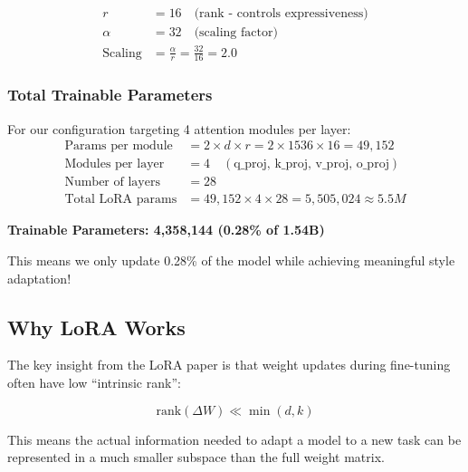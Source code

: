 \documentclass[12pt,a4paper]{article}
\begin{document}
\begin{align}
    r &= 16 \quad \text{(rank - controls expressiveness)} \\
    \alpha &= 32 \quad \text{(scaling factor)} \\
    \text{Scaling} &= \frac{\alpha}{r} = \frac{32}{16} = 2.0
\end{align}

\subsubsection{Total Trainable Parameters}

For our configuration targeting 4 attention modules per layer:
\begin{align}
    \text{Params per module} &= 2 \times d \times r = 2 \times 1536 \times 16 = 49,152 \\
    \text{Modules per layer} &= 4 \quad (\text{q\_proj, k\_proj, v\_proj, o\_proj}) \\
    \text{Number of layers} &= 28 \\
    \text{Total LoRA params} &= 49,152 \times 4 \times 28 = 5,505,024 \approx 5.5M
\end{align}

\begin{tcolorbox}[colback=green!5!white,colframe=green!75!black,title=Parameter Efficiency]
\begin{center}
\textbf{Trainable Parameters: 4,358,144 (0.28\% of 1.54B)}
\end{center}
This means we only update 0.28\% of the model while achieving meaningful style adaptation!
\end{tcolorbox}

\subsection{Why LoRA Works}

The key insight from the LoRA paper is that weight updates during fine-tuning often have low ``intrinsic rank'':

\begin{equation}
    \text{rank}(\Delta W) \ll \min(d, k)
\end{equation}

This means the actual information needed to adapt a model to a new task can be represented in a much smaller subspace than the full weight matrix.

\end{document}
